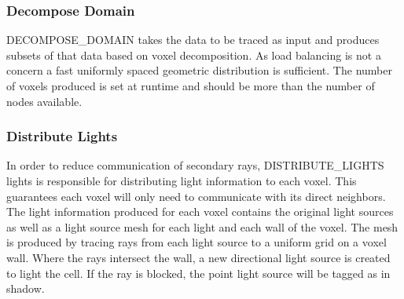 \documentclass{vgtc}                          %
\begin{document}
\subsubsection{Decompose Domain}

DECOMPOSE\_DOMAIN takes the data to be traced as input and produces
subsets of that data based on voxel decomposition. As load balancing
is not a concern
a fast uniformly spaced geometric distribution is sufficient. The
number of voxels produced is set at runtime and should be more than
the number of nodes available.

\subsubsection{Distribute Lights}

In order to reduce communication of secondary rays, DISTRIBUTE\_LIGHTS
lights is responsible for distributing light information to each
voxel. This guarantees each voxel will only need to communicate with
its direct neighbors. The light information produced for each voxel
contains the original light sources as well as a light source mesh for
each light and each wall of the voxel. The mesh is produced by tracing
rays from each light source to a uniform grid on a voxel wall. Where the
rays intersect the wall, a new directional light source is created to
light the cell. If the ray is blocked, the point light source will be
tagged as in shadow.
\end{document}

